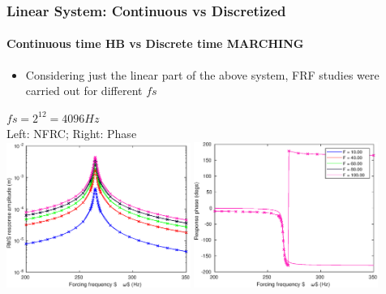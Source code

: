 \documentclass[9pt]{beamer}
\begin{document}
\begin{frame}
  \frametitle{Linear System: Continuous vs Discretized}
  \framesubtitle{Continuous time HB vs Discrete time MARCHING}
  \begin{itemize}
  \item Considering just the linear part of the above system, FRF
    studies were carried out for different $fs$
  \end{itemize}
  \begin{center}
    $fs = 2^{12} = 4096 Hz$\\
   Left: NFRC; Right: Phase\\
   \includegraphics[width=0.45\textwidth]{../../benchmark0/fig/TMdssex_frf_Amp_fs4096}
   \includegraphics[width=0.45\textwidth]{../../benchmark0/fig/TMdssex_frf_Phase_fs4096}
  \end{center}  
\end{frame}
\end{document}
